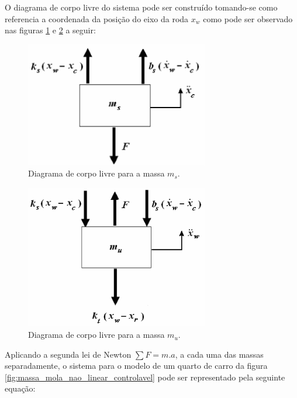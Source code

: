 \documentclass[a4paper]{ifacconf}
\begin{document}
    O diagrama de corpo livre do sistema pode ser construído tomando-se como referencia a coordenada da posição do eixo da roda $x_w$ como pode ser observado nas figuras \ref{fig:corpo_livre_ms} e \ref{fig:corpo_livre_mu} a seguir:
    \FloatBarrier
    \begin{figure}[htbp]
        \begin{centering}
            \includegraphics[width=8cm]{img/corpo_livre_ms.png}
            \caption{Diagrama de corpo livre para a massa $m_s$.} 
            \label{fig:corpo_livre_ms}
        \end{centering}
    \end{figure}
    \FloatBarrier
    \begin{figure}[htbp]
        \begin{centering}
            \includegraphics[width=8cm]{img/corpo_livre_mu.png}
            \caption{Diagrama de corpo livre para a massa $m_u$.} 
            \label{fig:corpo_livre_mu}
        \end{centering}
    \end{figure}
    \FloatBarrier
    
    Aplicando a segunda lei de Newton $\sum{F}=m.a$, a cada uma das massas separadamente, o sistema para o modelo de um quarto de carro da figura \ref{fig:massa_mola_nao_linear_controlavel} pode ser representado pela seguinte equação:
    
\end{document}
